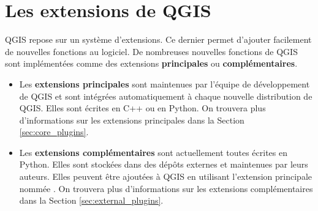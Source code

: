 

\section{Les extensions de QGIS}\label{sec:extensions}



QGIS repose sur un syst\`eme d'extensions.
Ce dernier permet d'ajouter facilement de nouvelles fonctions au logiciel. 
De nombreuses nouvelles fonctions de QGIS sont impl\'ement\'ees comme des extensions \textbf{principales} ou \textbf{compl\'ementaires}.  


\begin{itemize}
\item Les \textbf{extensions principales} sont maintenues par l'\'equipe de d\'eveloppement de QGIS et sont int\'egr\'ees automatiquement \`a chaque nouvelle distribution de QGIS.
Elles sont \'ecrites en C++ ou en Python.
On trouvera plus d'informations sur les extensions principales dans la Section \ref{sec:core_plugins}.
\item Les \textbf{extensions compl\'ementaires} sont actuellement toutes \'ecrites en Python.
Elles sont stock\'ees dans des d\'ep\^ots externes et maintenues par leurs auteurs.
Elles peuvent \^etre ajout\'ees \`a QGIS en utilisant l'extension principale nomm\'ee .
On trouvera plus d'informations sur les extensions compl\'ementaires dans la Section \ref{sec:external_plugins}.
\end{itemize}

